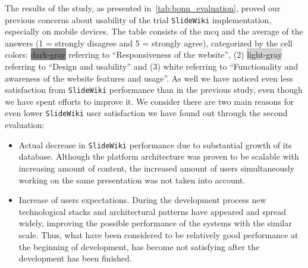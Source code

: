 \documentclass[PhD, Submit, ngerman,UKenglish,table]{scrbook}
\begin{document}
The results of the study, as presented in~\autoref{tab:bonn_evaluation}, proved our previous concerns about usability of the trial \texttt{SlideWiki} implementation, especially on mobile devices.
The table consists of the \gls{mcq} and the average of the answers (1 = strongly disagree and 5 = strongly agree), categorized by the cell colors: \colorbox{Gray}{dark-gray} referring to “Responsiveness of the website”, (2) \colorbox{LightGray}{light-gray} referring to “Design and usability” and (3) white referring to “Functionality and awareness of the website features and usage”.
As well we have noticed even less satisfaction from \texttt{SlideWiki} performance than in the previous study, even though we have spent efforts to improve it.
We consider there are two main reasons for even lower \texttt{SlideWiki} user satisfaction we have found out through the second evaluation:
\begin{itemize}
\item Actual decrease in \texttt{SlideWiki} performance due to substantial growth of its database. Although the platform architecture was proven to be scalable with increasing amount of content, the increased amount of users simultaneously working on the same presentation was not taken into account.
\item Increase of users expectations. During the development process new technological stacks and architectural patterns have appeared and spread widely, improving the possible performance of the systems with the similar scale. Thus, what have been considered to be relatively good performance at the beginning of development, has become not satisfying after the development has been finished.
\end{itemize}
\end{document}
